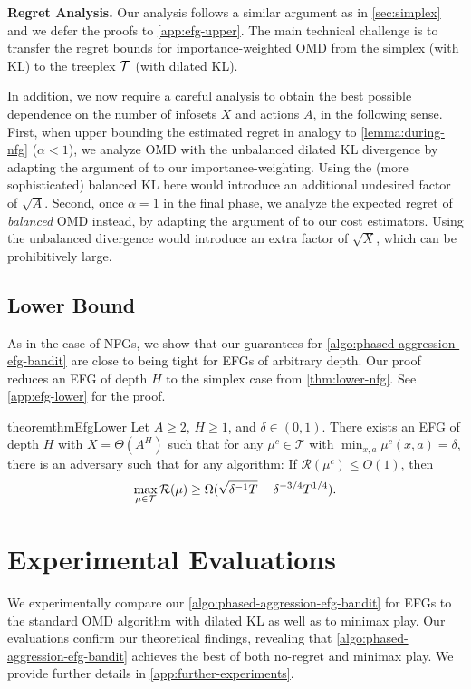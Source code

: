 \documentclass[11pt]{article}
\begin{document}
\textbf{Regret Analysis.} Our analysis follows a similar argument as in \cref{sec:simplex} and we defer the proofs to \cref{app:efg-upper}. The main technical challenge is to transfer the regret bounds for importance-weighted OMD from the simplex (with KL) to the treeplex $\mathcal{T}$ (with dilated KL).

In addition, we now require a careful analysis to obtain the best possible dependence on the number of infosets $X$ and actions $A$, in the following sense. First, when upper bounding the estimated regret in analogy to \cref{lemma:during-nfg} ($\alpha<1$), we analyze OMD with the unbalanced dilated KL divergence by adapting the argument of \citet{kozuno2021model} to our importance-weighting. Using the (more sophisticated) balanced KL here would introduce an additional undesired factor of $\sqrt{A}$. Second, once $\alpha=1$ in the final phase, we analyze the expected regret of \emph{balanced} OMD instead, by adapting the argument of \citet{bai2022near} to our cost estimators. Using the unbalanced divergence would introduce an extra factor of $\sqrt{X}$, which can be prohibitively large.

\subsection{Lower Bound} \label{sec:efg-lower}

As in the case of NFGs, we show that our guarantees for \cref{algo:phased-aggression-efg-bandit} are close to being tight for EFGs of arbitrary depth. Our proof reduces an EFG of depth $H$ to the simplex case from \cref{thm:lower-nfg}. See \cref{app:efg-lower} for the proof.  
\begin{restatable}{theorem}{thmEfgLower}\label{thm:lb-efg-bandit}
    Let $A\geq 2$, $H \geq 1$, and $\delta \in (0,1)$. There exists an EFG of depth $H$ with $X=\Theta(A^H)$ such that for any $\mu^c\in\mathcal{T}$ with $\min_{x,a} \mu^c(x,a) = \delta$, there is an adversary such that for any algorithm: If $\mathcal{R}(\mu^c) \leq O(1)$, then
    \begin{align*}
         \max_{\mu\in\mathcal{T}} \mathcal{R}(\mu) \geq \Omega(\sqrt{\delta^{-1}T} - \delta^{-3/4}T^{1/4}).
    \end{align*}
\end{restatable}

\section{Experimental Evaluations} \label{sec:experiments}
We experimentally compare our \cref{algo:phased-aggression-efg-bandit} for EFGs to the standard OMD algorithm with dilated KL \citep{kozuno2021model} as well as to minimax play. Our evaluations confirm our theoretical findings, revealing that \cref{algo:phased-aggression-efg-bandit} achieves the best of both no-regret and minimax play. We provide further details in \cref{app:further-experiments}.
\end{document}
